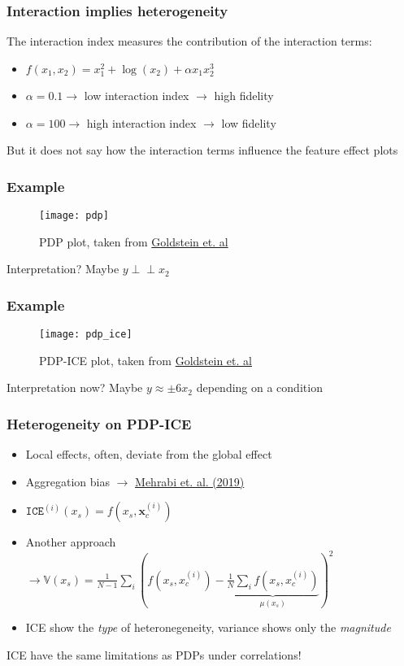 \begin{frame}
  \frametitle{Interaction implies heterogeneity}
  The interaction index measures the contribution of the interaction terms:

  \begin{itemize}
    \item \(f(x_1, x_2) = x_1^2 + \log(x_2) + \alpha x_1x_2^3\)
    \item \(\alpha = 0.1 \rightarrow\) low interaction index \(\rightarrow\) high fidelity
    \item \(\alpha = 100 \rightarrow\) high interaction index \(\rightarrow\) low fidelity
    \end{itemize}
  \noindent\makebox[\linewidth]{\rule{\paperwidth}{0.4pt}}
  But it does not say how the interaction terms influence the feature effect plots
\end{frame}


\begin{frame}
  \frametitle{Example}
  \begin{figure}
    \centering
    \texttt{[image: pdp]}
    \caption{PDP plot, taken from \href{https://arxiv.org/abs/1309.6392}{Goldstein et. al}}
  \end{figure}
  \noindent\makebox[\linewidth]{\rule{\paperwidth}{0.4pt}}
  Interpretation?
  Maybe $y \perp\!\!\!\!\perp x_2$
\end{frame}

\begin{frame}
  \frametitle{Example}
  \begin{figure}
    \centering
    \texttt{[image: pdp\_ice]}
    \caption{PDP-ICE plot, taken from \href{https://arxiv.org/abs/1309.6392}{Goldstein et. al}}
  \end{figure}
  \noindent\makebox[\linewidth]{\rule{\paperwidth}{0.4pt}}
  Interpretation now? Maybe $y \approx \pm 6 x_2 $ depending on a condition
\end{frame}

\begin{frame}
  \frametitle{Heterogeneity on PDP-ICE}
  \begin{itemize}
    \item Local effects, often, deviate from the global effect
    \item Aggregation bias $\rightarrow$ \href{https://arxiv.org/pdf/1908.09635.pdf}{Mehrabi et. al. (2019)}
    \item $\mathtt{ICE}^{(i)}(x_s) = f(x_s, \mathbf{x}_c^{(i)})$
    \item Another approach $\rightarrow \mathbb{V}(x_s) = \frac{1}{N-1}\sum_i \left ( f(x_s, x_c^{(i)}) - \underbrace{\frac{1}{N} \sum_i f(x_s, x_c^{(i)})}_{\mu(x_s)} \right)^2$
    \item ICE show the \emph{type} of heteronegeneity, variance shows only the \emph{magnitude}
  \end{itemize}
  \noindent\makebox[\linewidth]{\rule{\paperwidth}{0.4pt}}
  ICE have the same limitations as PDPs under correlations!
\end{frame}

